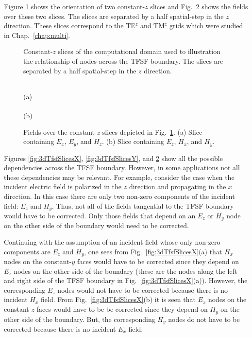 Figure \ref{fig:3dTfsfConstantZ} shows the orientation of two
constant-$z$ slices and Fig.\ \ref{fig:3dTfsfSlicesZ} shows the fields
over these two slices.  The slices are separated by a half
spatial-step in the $z$ direction.  These slices correspond to the
TE$^z$ and TM$^z$ grids which were studied in Chap.\ \ref{chap:multi}.

\begin{figure}
  \begin{center}
  \end{center} 
  \caption{Constant-$z$ slices of the computational domain used to
  illustration the relationship of nodes across the TFSF boundary.
  The slices are separated by a half spatial-step in the $z$ direction.}
  \label{fig:3dTfsfConstantZ}
\end{figure}

\begin{figure}
  \begin{center}
  \\
  (a)\\
  \vspace{.15in}
  \\
  (b)
  \end{center} 
  \vspace{-.15in}
  \caption{Fields over the constant-$z$ slices depicted in Fig.\
  \ref{fig:3dTfsfConstantZ}.  (a) Slice containing $E_x$, $E_y$, and
  $H_z$.  (b) Slice containing $E_z$, $H_x$, and $H_y$.}
  \label{fig:3dTfsfSlicesZ} 
\end{figure}

Figures \ref{fig:3dTfsfSlicesX}, \ref{fig:3dTfsfSlicesY}, and
\ref{fig:3dTfsfSlicesZ} show all the possible dependencies across the
TFSF boundary.  However, in some applications not all these
dependencies may be relevant.  For example, consider the case when the
incident electric field is polarized in the $z$ direction and
propagating in the $x$ direction.  In this case there are only two
non-zero components of the incident field: $E_z$ and $H_y$.  Thus, not
all of the fields tangential to the TFSF boundary would have to be
corrected.  Only those fields that depend on an $E_z$ or $H_y$ node
on the other side of the boundary would need to be corrected.

Continuing with the assumption of an incident field whose only
non-zero components are $E_z$ and $H_y$, one sees from Fig.\
\ref{fig:3dTfsfSlicesX}(a) that $H_x$ nodes on the constant-$y$ faces
would have to be corrected since they depend on $E_z$ nodes on the
other side of the boundary (these are the nodes along the left and
right side of the TFSF boundary in Fig.\ \ref{fig:3dTfsfSlicesX}(a)).
However, the corresponding $E_z$ nodes would not have to be corrected
because there is no incident $H_x$ field.  From Fig.\
\ref{fig:3dTfsfSlicesX}(b) it is seen that $E_x$ nodes on the
constant-$z$ faces would have to be be corrected since they depend on
$H_y$ on the other side of the boundary.  But, the corresponding $H_y$
nodes do not have to be corrected because there is no incident $E_x$
field.

